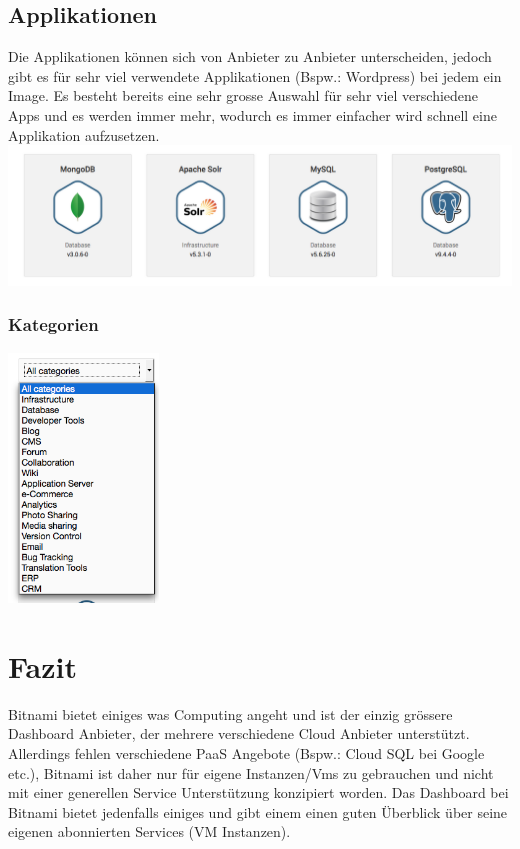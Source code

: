 \subsection{Applikationen}
Die Applikationen können sich von Anbieter zu Anbieter unterscheiden, jedoch 
gibt es für sehr viel verwendete Applikationen (Bspw.: Wordpress) bei jedem ein 
Image.
Es besteht bereits eine sehr grosse Auswahl für sehr viel verschiedene Apps und 
es werden immer mehr, wodurch es immer einfacher wird schnell eine Applikation 
aufzusetzen.
\includegraphics[width=\textwidth]{./03_Analyse/03_Bitnami/images/apps}

\subsubsection{Kategorien}
\includegraphics[width=0.3\textwidth]{./03_Analyse/03_Bitnami/images/categories}

\section{Fazit}
Bitnami bietet einiges was Computing angeht und ist der einzig grössere 
Dashboard Anbieter, der mehrere verschiedene Cloud Anbieter unterstützt.
Allerdings fehlen verschiedene PaaS Angebote (Bspw.: Cloud SQL bei Google etc.), 
Bitnami ist daher nur für eigene Instanzen/Vms zu gebrauchen und nicht mit einer 
generellen Service Unterstützung konzipiert worden.
Das Dashboard bei Bitnami bietet jedenfalls einiges und gibt einem einen guten 
Überblick über seine eigenen abonnierten Services (VM Instanzen).

